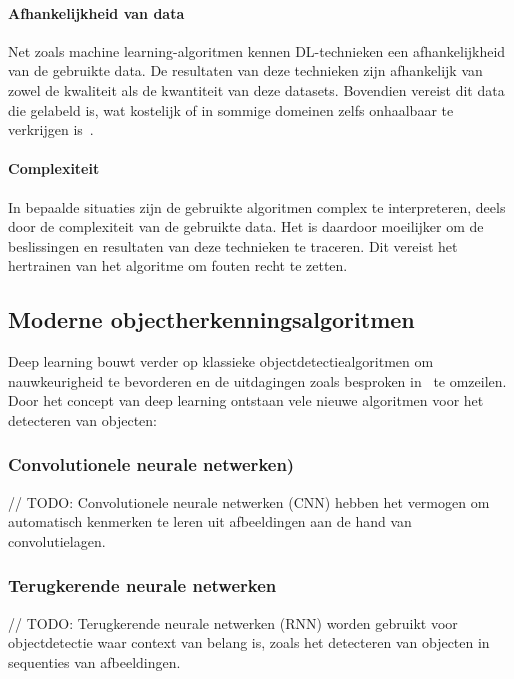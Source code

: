 \paragraph{Afhankelijkheid van data}
Net zoals machine learning-algoritmen kennen DL-technieken een afhankelijkheid van de gebruikte data.
De resultaten van deze technieken zijn afhankelijk van zowel de kwaliteit als de kwantiteit van deze datasets.
Bovendien vereist dit data die gelabeld is, wat kostelijk of in sommige domeinen zelfs onhaalbaar te verkrijgen is~\autocite{Olaoye2024a}.
\paragraph{Complexiteit}
In bepaalde situaties zijn de gebruikte algoritmen complex te interpreteren, deels door de complexiteit van de gebruikte data.
Het is daardoor moeilijker om de beslissingen en resultaten van deze technieken te traceren.
Dit vereist het hertrainen van het algoritme om fouten recht te zetten.

\subsection{Moderne objectherkenningsalgoritmen}
\label{subsec:deep-learning-in-objectherkenning}
Deep learning bouwt verder op klassieke objectdetectiealgoritmen om nauwkeurigheid te bevorderen en de uitdagingen zoals besproken in~ te omzeilen.
Door het concept van deep learning ontstaan vele nieuwe algoritmen voor het detecteren van objecten:

\subsubsection{Convolutionele neurale netwerken)}
// TODO: Convolutionele neurale netwerken (CNN) hebben het vermogen om automatisch kenmerken te leren uit afbeeldingen aan de hand van convolutielagen.

\subsubsection{Terugkerende neurale netwerken}
// TODO: Terugkerende neurale netwerken (RNN) worden gebruikt voor objectdetectie waar context van belang is, zoals het detecteren van objecten in sequenties van afbeeldingen.

